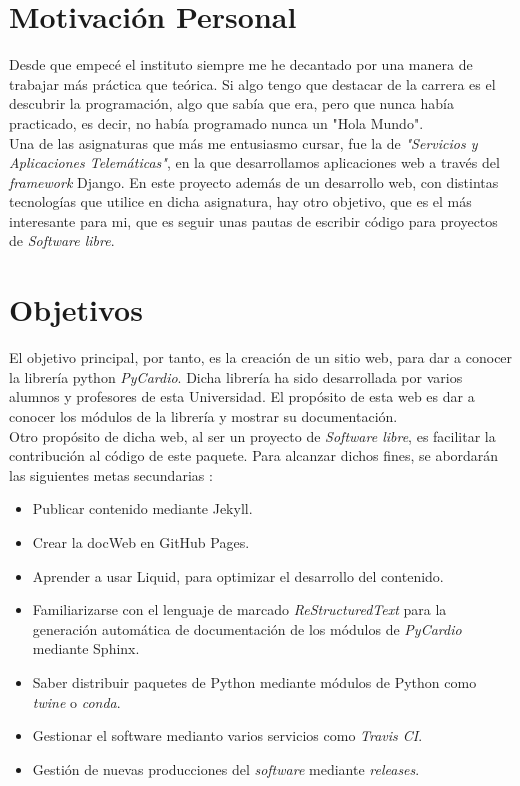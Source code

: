 \section{Motivación Personal}
\label{sec:mot}
Desde que empecé el instituto siempre me he decantado por una manera de trabajar más práctica que teórica. Si algo tengo que destacar de la carrera es el descubrir la programación, algo que sabía que era, pero que nunca había practicado, es decir, no había programado nunca un "Hola Mundo". \\
Una de las asignaturas que más me entusiasmo cursar, fue la de \emph{"Servicios y Aplicaciones Telemáticas"}, en la que desarrollamos aplicaciones web a través del \emph{framework} Django. En este proyecto además de un desarrollo web, con distintas tecnologías que utilice en dicha asignatura, hay otro objetivo, que es el más interesante para mi, que es seguir unas pautas de escribir código para proyectos de \emph{Software libre}.

\section{Objetivos}
\label{sec:objetivos}
El objetivo principal, por tanto, es la creación de un sitio web, para dar a conocer la librería python \emph{PyCardio}. Dicha librería ha sido desarrollada por varios alumnos y profesores de esta Universidad. El propósito de esta web es dar a conocer los módulos de la librería y mostrar su documentación. \\
Otro propósito de dicha web, al ser un proyecto de \emph{Software libre}, es facilitar la contribución al código de este paquete. Para alcanzar dichos fines, se abordarán las siguientes metas secundarias :
\begin{itemize}
    \item Publicar contenido mediante Jekyll.
    \item Crear la docWeb en GitHub Pages.
    \item Aprender a usar Liquid, para optimizar el desarrollo del contenido.
    \item Familiarizarse con el lenguaje de marcado \emph{ReStructuredText} para la generación automática de documentación de los módulos de \emph{PyCardio} mediante Sphinx.
    \item Saber distribuir paquetes de Python mediante módulos de Python como \emph{twine} o \emph{conda}.
    \item Gestionar el software medianto varios servicios como \emph{Travis CI}.
    \item Gestión de nuevas producciones del \emph{software} mediante \emph{releases}.
\end{itemize}

